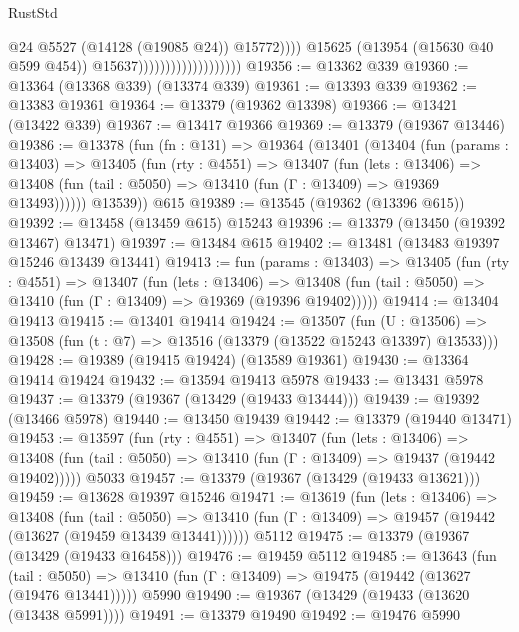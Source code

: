 \begin{lexlean}{RustStd}
\begin{coremodule}
                                                  @24
                                                  @5527
                                                  (@14128 (@19085 @24))
                                                  @15772))))
                                          @15625
                                          (@13954 (@15630 @40 @599 @454))
                                          @15637)))))))))))))))))))
@19356 := @13362 @339
@19360 := @13364 (@13368 @339) (@13374 @339)
@19361 := @13393 @339
@19362 := @13383 @19361
@19364 := @13379 (@19362 @13398)
@19366 := @13421 (@13422 @339)
@19367 := @13417 @19366
@19369 := @13379 (@19367 @13446)
@19386 := @13378
    (fun (fn : @131) =>
    @19364
      (@13401
        (@13404
          (fun (params : @13403) =>
          @13405
            (fun (rty : @4551) =>
            @13407
              (fun (lets : @13406) =>
              @13408 (fun (tail : @5050) => @13410 (fun (Γ : @13409) => @19369 @13493))))))
        @13539))
    @615
@19389 := @13545 (@19362 (@13396 @615))
@19392 := @13458 (@13459 @615) @15243
@19396 := @13379 (@13450 (@19392 @13467) @13471)
@19397 := @13484 @615
@19402 := @13481 (@13483 @19397 @15246 @13439 @13441)
@19413 := fun (params : @13403) =>
  @13405
    (fun (rty : @4551) =>
    @13407
      (fun (lets : @13406) =>
      @13408 (fun (tail : @5050) => @13410 (fun (Γ : @13409) => @19369 (@19396 @19402)))))
@19414 := @13404 @19413
@19415 := @13401 @19414
@19424 := @13507
    (fun (U : @13506) => @13508 (fun (t : @7) => @13516 (@13379 (@13522 @15243 @13397) @13533)))
@19428 := @19389 (@19415 @19424) (@13589 @19361)
@19430 := @13364 @19414 @19424
@19432 := @13594 @19413 @5978
@19433 := @13431 @5978
@19437 := @13379 (@19367 (@13429 (@19433 @13444)))
@19439 := @19392 (@13466 @5978)
@19440 := @13450 @19439
@19442 := @13379 (@19440 @13471)
@19453 := @13597
    (fun (rty : @4551) =>
    @13407
      (fun (lets : @13406) =>
      @13408 (fun (tail : @5050) => @13410 (fun (Γ : @13409) => @19437 (@19442 @19402)))))
    @5033
@19457 := @13379 (@19367 (@13429 (@19433 @13621)))
@19459 := @13628 @19397 @15246
@19471 := @13619
    (fun (lets : @13406) =>
    @13408
      (fun (tail : @5050) =>
      @13410 (fun (Γ : @13409) => @19457 (@19442 (@13627 (@19459 @13439 @13441))))))
    @5112
@19475 := @13379 (@19367 (@13429 (@19433 @16458)))
@19476 := @19459 @5112
@19485 := @13643
    (fun (tail : @5050) => @13410 (fun (Γ : @13409) => @19475 (@19442 (@13627 (@19476 @13441)))))
    @5990
@19490 := @19367 (@13429 (@19433 (@13620 (@13438 @5991))))
@19491 := @13379 @19490
@19492 := @19476 @5990

\end{coremodule}
\end{lexlean}
